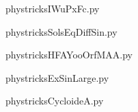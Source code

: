     

    \clearpage
    


    \newcommand{\CaptionFigIWuPxFc}{<+Type your caption here+>}
    \begin{center}
        
    \end{center}
    phystricksIWuPxFc.py

    

    \clearpage
    


    \newcommand{\CaptionFigSolsEqDiffSin}{<+Type your caption here+>}
    \begin{center}
        
    \end{center}
    phystricksSolsEqDiffSin.py

    

    \clearpage
    


    \newcommand{\CaptionFigHFAYooOrfMAA}{<+Type your caption here+>}
    \begin{center}
        
    \end{center}
    phystricksHFAYooOrfMAA.py

    

    \clearpage
    


    \newcommand{\CaptionFigExSinLarge}{<+Type your caption here+>}
    \begin{center}
        
    \end{center}
    phystricksExSinLarge.py

    

    \clearpage
    


    \newcommand{\CaptionFigCycloideA}{<+Type your caption here+>}
    \begin{center}
        
    \end{center}
    phystricksCycloideA.py

    

    \clearpage
    


